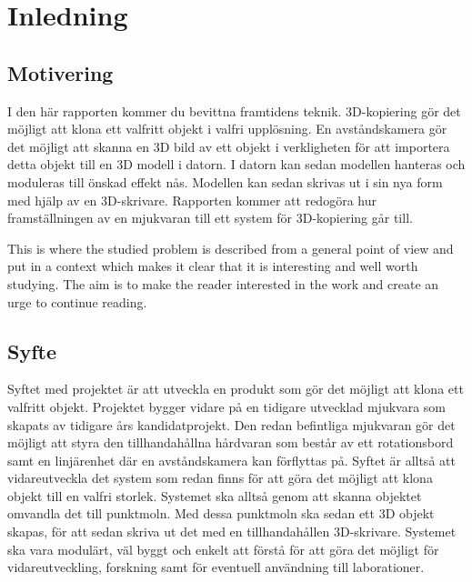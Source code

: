 \chapter{Inledning}
\label{cha:introduction}

\section{Motivering}
\label{sec:motivation}



I den här rapporten kommer du bevittna framtidens teknik. 3D-kopiering gör det möjligt att klona ett valfritt objekt i valfri upplösning. En avståndskamera gör det möjligt att skanna en 3D bild av ett objekt i verkligheten för att importera detta objekt till en 3D modell i datorn. I datorn kan sedan modellen hanteras och moduleras till önskad effekt nås. Modellen kan sedan skrivas ut i sin nya form med hjälp av en 3D-skrivare. Rapporten kommer att redogöra hur framställningen av en mjukvaran till ett system för 3D-kopiering går till.




\cite{scigen}

This is where the studied problem is described from a general
point of view and put in a context which makes it clear that
it is interesting and well worth studying. The aim is to make
the reader interested in the work and create an urge to
continue reading.

\section{Syfte}
\label{sec:aim}

Syftet med projektet är att utveckla en produkt som gör det möjligt att klona ett valfritt objekt. Projektet bygger vidare på en tidigare utvecklad mjukvara som skapats av tidigare års kandidatprojekt. Den redan befintliga mjukvaran gör det möjligt att styra den tillhandahållna hårdvaran som består av ett rotationsbord samt en linjärenhet där en avståndskamera kan förflyttas på. Syftet är alltså att vidareutveckla det system som redan finns för att göra det möjligt att klona objekt till en valfri storlek. Systemet ska alltså genom att skanna objektet omvandla det till punktmoln. Med dessa punktmoln ska sedan ett 3D objekt skapas, för att sedan skriva ut det med en tillhandahållen 3D-skrivare. Systemet ska vara modulärt, väl byggt och enkelt att förstå för att göra det möjligt för vidareutveckling, forskning samt för eventuell användning till laborationer. 


